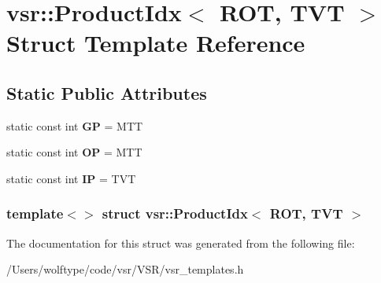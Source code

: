 \hypertarget{structvsr_1_1_product_idx_3_01_r_o_t_00_01_t_v_t_01_4}{\section{vsr\-:\-:Product\-Idx$<$ R\-O\-T, T\-V\-T $>$ Struct Template Reference}
\label{structvsr_1_1_product_idx_3_01_r_o_t_00_01_t_v_t_01_4}
}
\subsection*{Static Public Attributes}
\begin{DoxyCompactItemize}
\item 
\hypertarget{structvsr_1_1_product_idx_3_01_r_o_t_00_01_t_v_t_01_4_aa2e320f492d19dabd37b5b46435e414a}{static const int {\bfseries G\-P} = M\-T\-T}\label{structvsr_1_1_product_idx_3_01_r_o_t_00_01_t_v_t_01_4_aa2e320f492d19dabd37b5b46435e414a}

\item 
\hypertarget{structvsr_1_1_product_idx_3_01_r_o_t_00_01_t_v_t_01_4_a558397c05c6c2eff0f12568e930ccb6a}{static const int {\bfseries O\-P} = M\-T\-T}\label{structvsr_1_1_product_idx_3_01_r_o_t_00_01_t_v_t_01_4_a558397c05c6c2eff0f12568e930ccb6a}

\item 
\hypertarget{structvsr_1_1_product_idx_3_01_r_o_t_00_01_t_v_t_01_4_a4d39d77a9b9aa0cd1644bf018d89f6ff}{static const int {\bfseries I\-P} = T\-V\-T}\label{structvsr_1_1_product_idx_3_01_r_o_t_00_01_t_v_t_01_4_a4d39d77a9b9aa0cd1644bf018d89f6ff}

\end{DoxyCompactItemize}
\subsubsection*{template$<$$>$ struct vsr\-::\-Product\-Idx$<$ R\-O\-T, T\-V\-T $>$}



The documentation for this struct was generated from the following file\-:\begin{DoxyCompactItemize}
\item 
/\-Users/wolftype/code/vsr/\-V\-S\-R/vsr\-\_\-templates.\-h\end{DoxyCompactItemize}
